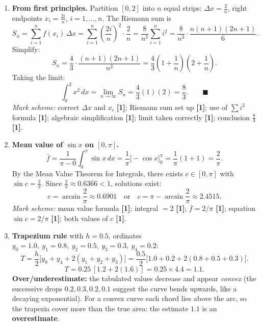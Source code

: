 \documentclass[11pt]{article}
\begin{document}
\begin{corrige}
\begin{enumerate}
\item \textbf{From first principles.} Partition $[0,2]$ into $n$ equal strips: $\Delta x = \frac{2}{n}$, right endpoints $x_i = \frac{2i}{n}$, $i = 1, \dots, n$. The Riemann sum is
\[
S_n = \sum_{i=1}^{n} f(x_i)\,\Delta x = \sum_{i=1}^{n}\left(\frac{2i}{n}\right)^2 \cdot \frac{2}{n} = \frac{8}{n^3}\sum_{i=1}^{n} i^2 = \frac{8}{n^3}\cdot\frac{n(n+1)(2n+1)}{6}.
\]
Simplify:
\[
S_n = \frac{4}{3}\cdot\frac{(n+1)(2n+1)}{n^2} = \frac{4}{3}\left(1+\frac1n\right)\left(2+\frac1n\right).
\]
Taking the limit:
\[
\int_0^2 x^2\,dx = \lim_{n\to\infty} S_n = \frac{4}{3}(1)(2) = \frac{8}{3}. \qquad\blacksquare
\]
\textit{Mark scheme:} correct $\Delta x$ and $x_i$ \textbf{[1]}; Riemann sum set up \textbf{[1]}; use of $\sum i^2$ formula \textbf{[1]}; algebraic simplification \textbf{[1]}; limit taken correctly \textbf{[1]}; conclusion $\frac83$ \textbf{[1]}.

\item \textbf{Mean value of $\sin x$ on $[0,\pi]$.}
\[
\bar{f} = \frac{1}{\pi - 0}\int_0^{\pi}\sin x\,dx = \frac{1}{\pi}\Big[-\cos x\Big]_0^{\pi} = \frac{1}{\pi}(1+1) = \frac{2}{\pi}.
\]
By the Mean Value Theorem for Integrals, there exists $c\in[0,\pi]$ with $\sin c = \frac{2}{\pi}$. Since $\frac{2}{\pi}\approx 0.6366 < 1$, solutions exist:
\[
c = \arcsin\frac{2}{\pi} \approx 0.6901 \quad\text{or}\quad c = \pi - \arcsin\frac{2}{\pi} \approx 2.4515.
\]
\textit{Mark scheme:} mean value formula \textbf{[1]}; integral $=2$ \textbf{[1]}; $\bar f = 2/\pi$ \textbf{[1]}; equation $\sin c = 2/\pi$ \textbf{[1]}; both values of $c$ \textbf{[1]}.

\item \textbf{Trapezium rule} with $h = 0.5$, ordinates $y_0 = 1.0,\ y_1 = 0.8,\ y_2 = 0.5,\ y_3 = 0.3,\ y_4 = 0.2$:
\[
T = \frac{h}{2}\Big[y_0 + y_4 + 2(y_1 + y_2 + y_3)\Big] = \frac{0.5}{2}\big[1.0 + 0.2 + 2(0.8+0.5+0.3)\big].
\]
\[
T = 0.25\,[1.2 + 2(1.6)] = 0.25 \times 4.4 = \boxed{1.1}.
\]
\textbf{Over/underestimate:} the tabulated values decrease and appear \emph{convex} (the successive drops $0.2, 0.3, 0.2, 0.1$ suggest the curve bends upwards, like a decaying exponential). For a convex curve each chord lies above the arc, so the trapezia cover more than the true area: the estimate $1.1$ is an \textbf{overestimate}.


\end{enumerate}
\end{corrige}
\end{document}
